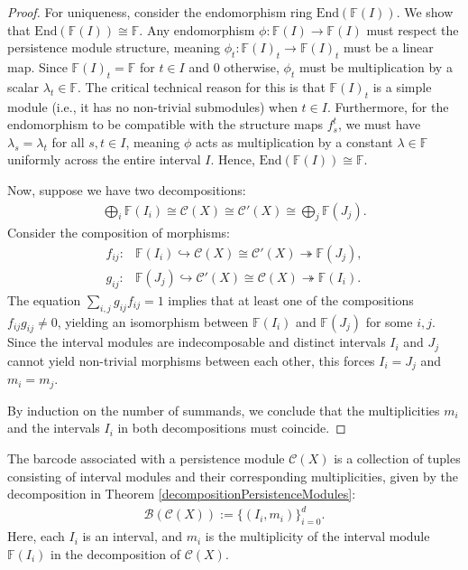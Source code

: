 \begin{proof}
For uniqueness, consider the endomorphism ring $\text{End}(\mathbb{F}(I))$. We show that $\text{End}(\mathbb{F}(I)) \cong \mathbb{F}$. Any endomorphism $\phi: \mathbb{F}(I) \to \mathbb{F}(I)$ must respect the persistence module structure, meaning $\phi_t: \mathbb{F}(I)_t \to \mathbb{F}(I)_t$ must be a linear map. Since $\mathbb{F}(I)_t = \mathbb{F}$ for $t \in I$ and $0$ otherwise, $\phi_t$ must be multiplication by a scalar $\lambda_t \in \mathbb{F}$. The critical technical reason for this is that $\mathbb{F}(I)_t$ is a simple module (i.e., it has no non-trivial submodules) when $t \in I$. Furthermore, for the endomorphism to be compatible with the structure maps $f_{s}^t$, we must have $\lambda_s = \lambda_t$ for all $s, t \in I$, meaning $\phi$ acts as multiplication by a constant $\lambda \in \mathbb{F}$ uniformly across the entire interval $I$. Hence, $\text{End}(\mathbb{F}(I)) \cong \mathbb{F}$.

Now, suppose we have two decompositions:
\begin{align}
	\bigoplus_i \mathbb{F}(I_i) \cong \mathcal{C}(X) \cong \mathcal{C}'(X) \cong \bigoplus_j \mathbb{F}(J_j).
\end{align}
Consider the composition of morphisms:
\begin{align}
	f_{ij}: &\mathbb{F}(I_i) \hookrightarrow \mathcal{C}(X) \cong \mathcal{C}'(X) \twoheadrightarrow \mathbb{F}(J_j),\\
	g_{ij}: &\mathbb{F}(J_j) \hookrightarrow \mathcal{C}'(X) \cong \mathcal{C}(X) \twoheadrightarrow \mathbb{F}(I_i).
\end{align}
The equation $\sum_{i,j} g_{ij}f_{ij} = 1$ implies that at least one of the compositions $f_{ij}g_{ij} \neq 0$, yielding an isomorphism between $\mathbb{F}(I_i)$ and $\mathbb{F}(J_j)$ for some $i, j$. Since the interval modules are indecomposable and distinct intervals $I_i$ and $J_j$ cannot yield non-trivial morphisms between each other, this forces $I_i = J_j$ and $m_i = m_j$. 

By induction on the number of summands, we conclude that the multiplicities $m_i$ and the intervals $I_i$ in both decompositions must coincide.
\end{proof}

\begin{definition}
The barcode associated with a persistence module $\mathcal{C}(X)$ is a collection of tuples consisting of interval modules and their corresponding multiplicities, given by the decomposition in Theorem \ref{decompositionPersistenceModules}:
\begin{align}
	\mathcal{B}(\mathcal{C}(X)) := \{(I_i, m_i)\}_{i=0}^d.
\end{align}
Here, each $I_i$ is an interval, and $m_i$ is the multiplicity of the interval module $\mathbb{F}(I_i)$ in the decomposition of $\mathcal{C}(X)$.
\end{definition}

